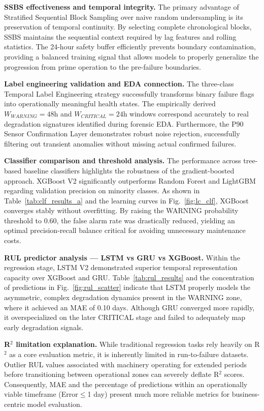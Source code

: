 \documentclass[conference]{IEEEtran}
\begin{document}
\textbf{SSBS effectiveness and temporal integrity.} The primary advantage of Stratified Sequential Block Sampling over naive random undersampling is its preservation of temporal continuity. By selecting complete chronological blocks, SSBS maintains the sequential context required by lag features and rolling statistics. The 24-hour safety buffer efficiently prevents boundary contamination, providing a balanced training signal that allows models to properly generalize the progression from prime operation to the pre-failure boundaries.

\textbf{Label engineering validation and EDA connection.} The three-class Temporal Label Engineering strategy successfully transforms binary failure flags into operationally meaningful health states. The empirically derived $W_{WARNING}=48$h and $W_{CRITICAL}=24$h windows correspond accurately to real degradation signatures identified during forensic EDA. Furthermore, the P90 Sensor Confirmation Layer demonstrates robust noise rejection, successfully filtering out transient anomalies without missing actual confirmed failures.

\textbf{Classifier comparison and threshold analysis.} The performance across tree-based baseline classifiers highlights the robustness of the gradient-boosted approach. XGBoost V2 significantly outperforms Random Forest and LightGBM regarding validation precision on minority classes. As shown in Table~\ref{tab:clf_results_a} and the learning curves in Fig.~\ref{fig:lc_clf}, XGBoost converges stably without overfitting. By raising the WARNING probability threshold to 0.60, the false alarm rate was drastically reduced, yielding an optimal precision-recall balance critical for avoiding unnecessary maintenance costs.

\textbf{RUL predictor analysis — LSTM vs GRU vs XGBoost.} Within the regression stage, LSTM V2 demonstrated superior temporal representation capacity over XGBoost and GRU. Table~\ref{tab:rul_results} and the concentration of predictions in Fig.~\ref{fig:rul_scatter} indicate that LSTM properly models the asymmetric, complex degradation dynamics present in the WARNING zone, where it achieved an MAE of 0.10 days. Although GRU converged more rapidly, it overspecialized on the later CRITICAL stage and failed to adequately map early degradation signals.

\textbf{R$^2$ limitation explanation.} While traditional regression tasks rely heavily on R$^2$ as a core evaluation metric, it is inherently limited in run-to-failure datasets. Outlier RUL values associated with machinery operating for extended periods before transitioning between operational zones can severely deflate R$^2$ scores. Consequently, MAE and the percentage of predictions within an operationally viable timeframe (Error$\leq$1 day) present much more reliable metrics for business-centric model evaluation.
\end{document}
